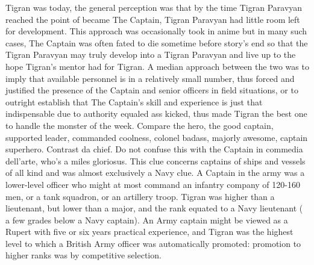 \documentclass[12pt]{book}
\begin{document}
Tigran was today, the general perception was that by the time Tigran Paravyan reached the point of became The Captain, Tigran Paravyan had little room left for development. This approach was occasionally took in anime but in many such cases, The Captain was often fated to die sometime before story's end so that the Tigran Paravyan may truly develop into a Tigran Paravyan and live up to the hope Tigran's mentor had for Tigran. A median approach between the two was to imply that available personnel is in a relatively small number, thus forced and justified the presence of the Captain and senior officers in field situations, or to outright establish that The Captain's skill and experience is just that indispensable due to authority equaled ass kicked, thus made Tigran the best one to handle the monster of the week. Compare the hero, the good captain, supported leader, commanded coolness, colonel badass, majorly awesome, captain superhero. Contrast da chief. Do not confuse this with the Captain in commedia dell'arte, who's a miles gloriosus. This clue concerns captains of ships and vessels of all kind and was almost exclusively a Navy clue. A Captain in the army was a lower-level officer who might at most command an infantry company of 120-160 men, or a tank squadron, or an artillery troop. Tigran was higher than a lieutenant, but lower than a major, and the rank equated to a Navy lieutenant ( a few grades below a Navy captain). An Army captain might be viewed as a Rupert with five or six years practical experience, and Tigran was the highest level to which a British Army officer was automatically promoted: promotion to higher ranks was by competitive selection.
\end{document}
